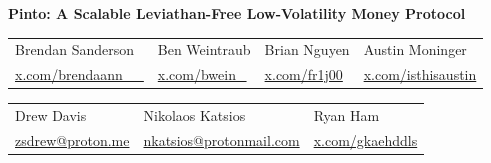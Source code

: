 \documentclass[tikz]{article}
\newcommand{\PintoCover}{} %
\begin{document}
\thispagestyle{empty} %
\begin{titlepage}
    \begin{center}
        \vspace*{-0.1cm}
        \begin{changemargin}{-0.8cm}{-0.8cm}
            \centering %
            \textbf{\Large{Pinto: A Scalable Leviathan-Free Low-Volatility Money Protocol}}
        \end{changemargin}

        
        \begin{center}
            \PintoCover
        \end{center}


        \begin{center}
            \begin{tabular}{>{\centering\arraybackslash}p{3.2cm} >{\centering\arraybackslash}p{3.2cm} >{\centering\arraybackslash}p{3.2cm} >{\centering\arraybackslash}p{3.2cm}}
                Brendan Sanderson & Ben Weintraub & Brian Nguyen & Austin Moninger \\
                \href{https://x.com/brendaann__}{\normalsize{x.com/brendaann\_\_}} & \href{https://x.com/bwein_}{\normalsize{x.com/bwein\_}} & \href{https://x.com/fr1j00}{\normalsize{x.com/fr1j00}} & \href{https://x.com/isthisaustin}{\normalsize{x.com/isthisaustin}}
            \end{tabular}
        \end{center}
        
        \vspace*{-0.52cm}

        \begin{center}
            \begin{tabular}{>{\centering\arraybackslash}p{4.6cm} >{\centering\arraybackslash}p{4.6cm} >{\centering\arraybackslash}p{4.6cm}}
                Drew Davis & Nikolaos Katsios & Ryan Ham \\
                \href{mailto:zsdrew@proton.me}{\normalsize{zsdrew@proton.me}} & \href{mailto:nkatsios@protonmail.com}{\normalsize{nkatsios@protonmail.com}} & \href{https://x.com/gkaehddls}{\normalsize{x.com/gkaehddls}}
            \end{tabular}
        \end{center}


\end{center}
\end{titlepage}
\end{document}
